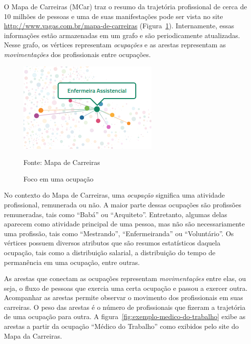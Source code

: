 \documentclass[12pt,a4paper]{article}
\theoremstyle{hypo}
\newcommand{\source}[1]{\vspace{-10pt} \caption*{Fonte: {#1}} }
\begin{document}
O Mapa de Carreiras (MCar) traz o resumo da trajetória profissional de cerca de 10 milhões de pessoas e uma de suas manifestações pode ser vista no site \url{http://www.vagas.com.br/mapa-de-carreiras} (Figura~\ref{fig:exemplo-grafo}). Internamente, essas informações estão armazenadas em um grafo e são periodicamente atualizadas. Nesse grafo, os vértices representam \textit{ocupações} e as arestas representam as \textit{movimentações} dos profissionais entre ocupações.

\begin{figure}[ht]
  \centering
  \includegraphics[scale=0.8, frame]{mapa-enfermeira-assistencial.png}
  \caption{Foco em uma ocupação}
  \source{Mapa de Carreiras}
  \label{fig:exemplo-grafo}
\end{figure}


No contexto do Mapa de Carreiras, uma \textit{ocupação} significa uma atividade profissional, remunerada ou não. A maior parte dessas ocupações são profissões remuneradas, tais como \enquote{Babá} ou \enquote{Arquiteto}. Entretanto, algumas delas aparecem como atividade principal de uma pessoa, mas não são necessariamente uma profissão, tais como \enquote{Mestrando}, \enquote{Enfermeiranda} ou \enquote{Voluntário}. Os vértices possuem diversos atributos que são resumos estatísticos daquela ocupação, tais como a distribuição salarial, a distribuição do tempo de permanência em uma ocupação, entre outras.


As arestas que conectam as ocupações representam \textit{movimentações} entre elas, ou seja, o fluxo de pessoas que exercia uma certa ocupação e passou a exercer outra. Acompanhar as arestas permite observar o movimento dos profissionais em suas carreiras. O peso das arestas é o número de profissionais que fizeram a trajetória de uma ocupação para outra. A figura~\ref{fig:exemplo-medico-do-trabalho} exibe as arestas a partir da ocupação \enquote{Médico do Trabalho} como exibidos pelo site do Mapa da Carreiras.
\end{document}
